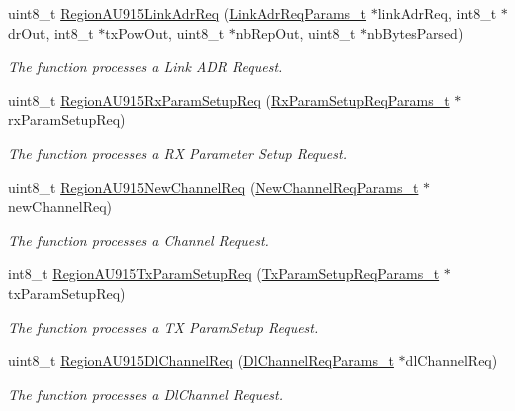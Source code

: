 \begin{DoxyCompactItemize}
uint8\+\_\+t \hyperlink{group__REGIONAU915_ga2614037d99a37bdd1d3d7df1a3361201}{Region\+A\+U915\+Link\+Adr\+Req} (\hyperlink{group__REGION_gad4af503e8d4de1846129e26a799a1e8e}{Link\+Adr\+Req\+Params\+\_\+t} $\ast$link\+Adr\+Req, int8\+\_\+t $\ast$dr\+Out, int8\+\_\+t $\ast$tx\+Pow\+Out, uint8\+\_\+t $\ast$nb\+Rep\+Out, uint8\+\_\+t $\ast$nb\+Bytes\+Parsed)
\begin{DoxyCompactList}\small\item\em The function processes a Link A\+DR Request. \end{DoxyCompactList}\item 
uint8\+\_\+t \hyperlink{group__REGIONAU915_ga865421723c0e1878fc94a151e95e6ee3}{Region\+A\+U915\+Rx\+Param\+Setup\+Req} (\hyperlink{group__REGION_ga7165f282c670c728c36d534df2285157}{Rx\+Param\+Setup\+Req\+Params\+\_\+t} $\ast$rx\+Param\+Setup\+Req)
\begin{DoxyCompactList}\small\item\em The function processes a RX Parameter Setup Request. \end{DoxyCompactList}\item 
uint8\+\_\+t \hyperlink{group__REGIONAU915_gab50eb32c1a156ee9629976c7bf29967c}{Region\+A\+U915\+New\+Channel\+Req} (\hyperlink{group__REGION_gae2abcdb6dbb843c9faf5fd3009eca9d6}{New\+Channel\+Req\+Params\+\_\+t} $\ast$new\+Channel\+Req)
\begin{DoxyCompactList}\small\item\em The function processes a Channel Request. \end{DoxyCompactList}\item 
int8\+\_\+t \hyperlink{group__REGIONAU915_gaa6db7d4c1d3b1e547aa00c13e1d31b08}{Region\+A\+U915\+Tx\+Param\+Setup\+Req} (\hyperlink{group__REGION_ga26836ef2996e70410e42ef471073f855}{Tx\+Param\+Setup\+Req\+Params\+\_\+t} $\ast$tx\+Param\+Setup\+Req)
\begin{DoxyCompactList}\small\item\em The function processes a TX Param\+Setup Request. \end{DoxyCompactList}\item 
uint8\+\_\+t \hyperlink{group__REGIONAU915_ga8568053064f5db87978653f9fd218177}{Region\+A\+U915\+Dl\+Channel\+Req} (\hyperlink{group__REGION_gae0d608ff1f8ea0a430e4f9a4c38ec7f3}{Dl\+Channel\+Req\+Params\+\_\+t} $\ast$dl\+Channel\+Req)
\begin{DoxyCompactList}\small\item\em The function processes a Dl\+Channel Request. \end{DoxyCompactList}\item 

\end{DoxyCompactItemize}
